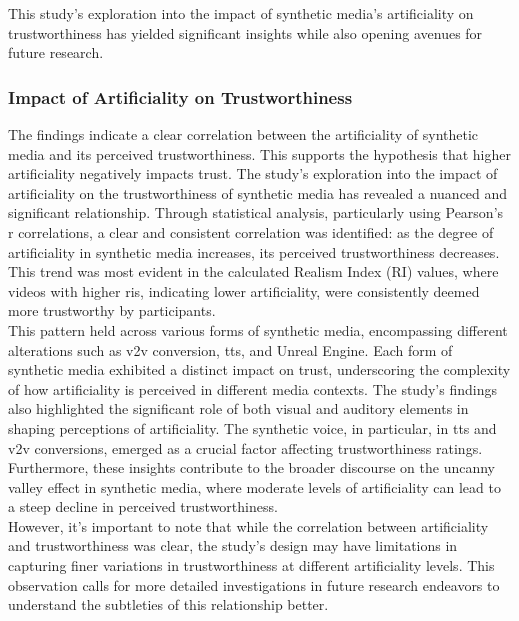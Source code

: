 \documentclass[
  a4paper,  %
  twoside,  %
  bibliography=totoc,
  headsepline,
  cleardoublepage=empty,
  parskip=half,
  draft=false
]{scrbook}
\begin{document}
This study’s exploration into the impact of synthetic media's artificiality on trustworthiness has yielded significant insights while also opening avenues for future research.

\subsubsection{Impact of Artificiality on Trustworthiness}
The findings indicate a clear correlation between the artificiality of synthetic media and its perceived trustworthiness. This supports the hypothesis that higher artificiality negatively impacts trust. The study's exploration into the impact of artificiality on the trustworthiness of synthetic media has revealed a nuanced and significant relationship. Through statistical analysis, particularly using Pearson's r correlations, a clear and consistent correlation was identified: as the degree of artificiality in synthetic media increases, its perceived trustworthiness decreases. This trend was most evident in the calculated Realism Index (RI) values, where videos with higher \gls{ri}s, indicating lower artificiality, were consistently deemed more trustworthy by participants. \\
This pattern held across various forms of synthetic media, encompassing different alterations such as \gls{v2v} conversion, \gls{tts}, and Unreal Engine. Each form of synthetic media exhibited a distinct impact on trust, underscoring the complexity of how artificiality is perceived in different media contexts. The study's findings also highlighted the significant role of both visual and auditory elements in shaping perceptions of artificiality. The synthetic voice, in particular, in \gls{tts} and \gls{v2v} conversions, emerged as a crucial factor affecting trustworthiness ratings. \\
Furthermore, these insights contribute to the broader discourse on the uncanny valley effect in synthetic media, where moderate levels of artificiality can lead to a steep decline in perceived trustworthiness. \\
However, it's important to note that while the correlation between artificiality and trustworthiness was clear, the study's design may have limitations in capturing finer variations in trustworthiness at different artificiality levels. This observation calls for more detailed investigations in future research endeavors to understand the subtleties of this relationship better.
\end{document}
